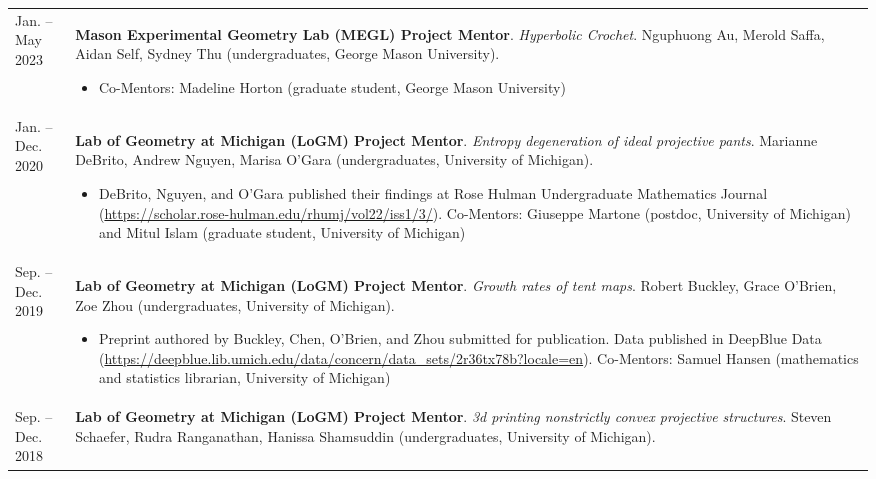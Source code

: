     \begin{center}
    {
    \renewcommand{\arraystretch}{1.5}
    \begin{longtable}{p{}  p{}}
     Jan.  --  May  2023 & \textbf{Mason Experimental Geometry Lab (MEGL) Project Mentor}. \textit{Hyperbolic Crochet}.  Nguphuong Au, Merold Saffa, Aidan Self, Sydney Thu (undergraduates, George Mason University). 
        \hspace{-1em}

        {\small
        \begin{itemize}
        \setlength{\parindent}{0em}
        \item[] 
            Co-Mentors: Madeline Horton (graduate student, George Mason University) 
        \end{itemize}
        }
        \vspace{-1em}
         \\ 
 Jan.  --  Dec.  2020 & \textbf{Lab of Geometry at Michigan (LoGM) Project Mentor}. \textit{Entropy degeneration of ideal projective pants}.  Marianne DeBrito, Andrew Nguyen, Marisa O'Gara (undergraduates, University of Michigan). 
        \hspace{-1em}

        {\small
        \begin{itemize}
        \setlength{\parindent}{0em}
        \item[] DeBrito, Nguyen, and O'Gara published their findings at Rose Hulman Undergraduate Mathematics Journal (\url{https://scholar.rose-hulman.edu/rhumj/vol22/iss1/3/}).
            Co-Mentors: Giuseppe Martone (postdoc, University of Michigan) and Mitul Islam (graduate student, University of Michigan) 
        \end{itemize}
        }
        \vspace{-1em}
         \\ 
 Sep.  --  Dec.  2019 & \textbf{Lab of Geometry at Michigan (LoGM) Project Mentor}. \textit{Growth rates of tent maps}.  Robert Buckley, Grace O'Brien, Zoe Zhou (undergraduates, University of Michigan). 
        \hspace{-1em}

        {\small
        \begin{itemize}
        \setlength{\parindent}{0em}
        \item[] Preprint authored by Buckley, Chen, O'Brien, and Zhou submitted for publication. Data published in DeepBlue Data (\url{https://deepblue.lib.umich.edu/data/concern/data_sets/2r36tx78b?locale=en}).
            Co-Mentors: Samuel Hansen (mathematics and statistics librarian, University of Michigan) 
        \end{itemize}
        }
        \vspace{-1em}
         \\ 
 Sep.  --  Dec.  2018 & \textbf{Lab of Geometry at Michigan (LoGM) Project Mentor}. \textit{3d printing nonstrictly convex projective structures}.  Steven Schaefer, Rudra Ranganathan, Hanissa Shamsuddin (undergraduates, University of Michigan). 
        \hspace{-1em}


\end{longtable}}
\end{center}
